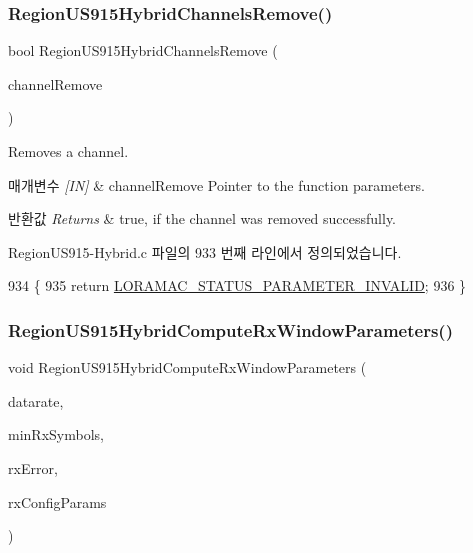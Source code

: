 \subsubsection{\texorpdfstring{Region\+U\+S915\+Hybrid\+Channels\+Remove()}{RegionUS915HybridChannelsRemove()}}
{\footnotesize\ttfamily bool Region\+U\+S915\+Hybrid\+Channels\+Remove (\begin{DoxyParamCaption}\item[{\mbox{\hyperlink{group___r_e_g_i_o_n_gaa37468560d2fc81a977b57a48e5d72c0}{Channel\+Remove\+Params\+\_\+t}} $\ast$}]{channel\+Remove }\end{DoxyParamCaption})}



Removes a channel. 


\begin{DoxyParams}{매개변수}
{\em \mbox{[}\+I\+N\mbox{]}} & channel\+Remove Pointer to the function parameters.\\
\hline
\end{DoxyParams}

\begin{DoxyRetVals}{반환값}
{\em Returns} & true, if the channel was removed successfully. \\
\hline
\end{DoxyRetVals}


Region\+U\+S915-\/\+Hybrid.\+c 파일의 933 번째 라인에서 정의되었습니다.


\begin{DoxyCode}
934 \{
935     \textcolor{keywordflow}{return} \mbox{\hyperlink{group___l_o_r_a_m_a_c_gga1d18f26b344040b3ec5c3db662919661ad0d3119f247d00e1787dda106fcb3017}{LORAMAC\_STATUS\_PARAMETER\_INVALID}};
936 \}
\end{DoxyCode}
\mbox{\label{group___r_e_g_i_o_n_u_s915_h_y_b_gaf5cfd5576e5648a2a0bb12a982beb973}} 
\subsubsection{\texorpdfstring{Region\+U\+S915\+Hybrid\+Compute\+Rx\+Window\+Parameters()}{RegionUS915HybridComputeRxWindowParameters()}}
{\footnotesize\ttfamily void Region\+U\+S915\+Hybrid\+Compute\+Rx\+Window\+Parameters (\begin{DoxyParamCaption}\item[{int8\+\_\+t}]{datarate,  }\item[{uint8\+\_\+t}]{min\+Rx\+Symbols,  }\item[{uint32\+\_\+t}]{rx\+Error,  }\item[{\mbox{\hyperlink{group___r_e_g_i_o_n_ga375c038078dfcfc7ef14280021db719e}{Rx\+Config\+Params\+\_\+t}} $\ast$}]{rx\+Config\+Params }\end{DoxyParamCaption})}

